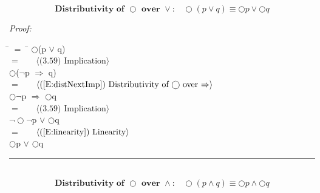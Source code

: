 \documentclass[fleqn, leqno]{article}
\newcommand{\lgap}{2pt}                             %
\newcommand{\mymathindent}{24pt}                      %
\newcommand{\Next}{\bigcirc}
\newcommand{\myqed}{\hfill\rule[-.23ex]{1.2ex}{2.0ex}}
\newcommand{\Gll} {\langle}                         %
\newcommand{\Ggg} {\rangle}                         %
\newcommand{\Hint}[1]     {\ \ \ $\Gll              \mbox{#1} \Ggg$ }   %
\begin{document}
\begin{equation}\label{E:distNextOr}
\textbf{Distributivity of $\Next$ over $\lor$:}\quad \Next (p \lor q) \equiv \Next p \lor \Next q
\end{equation}


\emph{Proof:}
\begin{tabbing}
\hspace{\mymathindent} \= $= \;$ \= \kill
	\> \>   $\Next$(p $\lor$ q)\\[\lgap]
	\> $=$  \>  \Hint{(3.59) Implication}\\[\lgap]
	\> \>   $\Next$($\lnot$p $\Rightarrow$ q)\\[\lgap]
	\> $=$  \>  \Hint{(\ref{E:distNextImp}) Distributivity of $\Next$ over $\Rightarrow$}\\[\lgap]
	\> \>   $\Next\lnot$p $\Rightarrow$ $\Next$q\\[\lgap]
	\> $=$  \>  \Hint{(3.59) Implication}\\[\lgap]
	\> \>   $\lnot\Next\lnot$p $\lor$ $\Next$q\\[\lgap]
	\> $=$  \>  \Hint{(\ref{E:linearity}) Linearity}\\[\lgap]
	\> \>   $\Next$p $\lor$ $\Next$q
\end{tabbing}
\myqed\\[\lgap]

\begin{equation}\label{E:distNextAnd}
\textbf{Distributivity of $\Next$ over $\land$:}\quad \Next (p \land q) \equiv \Next p \land \Next q
\end{equation}
\end{document}
